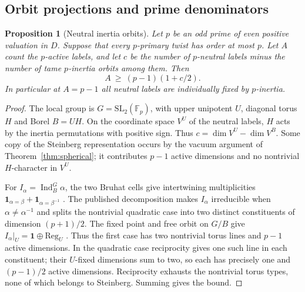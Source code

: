 \documentclass[11pt]{amsart}
\numberwithin{equation}{section}
\newtheorem{proposition}[theorem]{Proposition}
\theoremstyle{definition}
\theoremstyle{plain}
\begin{document}
\subsection{Orbit projections and prime denominators}
\begin{proposition}[Neutral inertia orbits]\label{round:neutral-inertia}
Let $p$ be an odd prime of even positive valuation in $D$.
Suppose that every $p$-primary twist has order at most $p$.
Let $A$ count the $p$-active labels, and let $c$ be the number
of $p$-neutral labels minus the number of tame $p$-inertia orbits
among them. Then
\[
                 A\ \ge\ (p-1)(1+c/2).
\]
In particular at $A=p-1$ all neutral labels are individually fixed
by $p$-inertia.
\end{proposition}
\begin{proof}
The local group is $G=\mathrm{SL}_2(\mathbb F_p)$, with upper
unipotent $U$, diagonal torus $H$ and Borel $B=UH$.
On the coordinate space $V^U$ of the neutral labels, $H$ acts
by the inertia permutations with positive sign. Thus
$c=\dim V^U-\dim V^B$. Some copy of the Steinberg representation
occurs by the vacuum argument of Theorem~\ref{thm:spherical};
it contributes $p-1$ active dimensions and no nontrivial
$H$-character in $V^U$.

For $I_\alpha=\operatorname{Ind}_B^G\alpha$, the two Bruhat cells
give intertwining multiplicities
$\mathbf1_{\alpha=\beta}+\mathbf1_{\alpha=\beta^{-1}}$
\cite[Proposition~2.14]{PrasadSL}. The published decomposition
\cite[Lemma~4.3]{Nevins} makes $I_\alpha$ irreducible when
$\alpha\ne\alpha^{-1}$ and splits the nontrivial quadratic case
into two distinct constituents of dimension $(p+1)/2$.
The fixed point and free orbit on $G/B$ give
$I_\alpha|_U=\mathbf1\oplus\mathrm{Reg}_U$
\cite[\S15.9]{DigneMichel}. Thus the first case has two nontrivial
torus lines and $p-1$ active dimensions. In the quadratic case
reciprocity gives one such line in each constituent; their
$U$-fixed dimensions sum to two, so each has precisely one and
$(p-1)/2$ active dimensions. Reciprocity exhausts the nontrivial
torus types, none of which belongs to Steinberg. Summing gives
the bound.
\end{proof}
\end{document}
